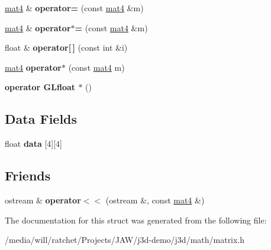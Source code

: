 \begin{DoxyCompactItemize}
\item 
\hypertarget{structj3d_1_1mat4_a9a71377f2c96a29f471befda124d60d7}{}\hyperlink{structj3d_1_1mat4}{mat4} \& {\bfseries operator=} (const \hyperlink{structj3d_1_1mat4}{mat4} \&m)\label{structj3d_1_1mat4_a9a71377f2c96a29f471befda124d60d7}

\item 
\hypertarget{structj3d_1_1mat4_ab14982474a28b0ebf2601388e0155c6a}{}\hyperlink{structj3d_1_1mat4}{mat4} \& {\bfseries operator$\ast$=} (const \hyperlink{structj3d_1_1mat4}{mat4} \&m)\label{structj3d_1_1mat4_ab14982474a28b0ebf2601388e0155c6a}

\item 
\hypertarget{structj3d_1_1mat4_a25bc83b10d8f478916cca0bb9c61bd60}{}float \& {\bfseries operator\mbox{[}$\,$\mbox{]}} (const int \&i)\label{structj3d_1_1mat4_a25bc83b10d8f478916cca0bb9c61bd60}

\item 
\hypertarget{structj3d_1_1mat4_a151d90e204efdcffa8940b8b0d541233}{}\hyperlink{structj3d_1_1mat4}{mat4} {\bfseries operator$\ast$} (const \hyperlink{structj3d_1_1mat4}{mat4} m)\label{structj3d_1_1mat4_a151d90e204efdcffa8940b8b0d541233}

\item 
\hypertarget{structj3d_1_1mat4_a60fd63eefecd4d85278cb744481fe27c}{}{\bfseries operator G\+Lfloat $\ast$} ()\label{structj3d_1_1mat4_a60fd63eefecd4d85278cb744481fe27c}

\end{DoxyCompactItemize}
\subsection*{Data Fields}
\begin{DoxyCompactItemize}
\item 
\hypertarget{structj3d_1_1mat4_a13193f5aeaa5a2daaf50563b3c62439d}{}float {\bfseries data} \mbox{[}4\mbox{]}\mbox{[}4\mbox{]}\label{structj3d_1_1mat4_a13193f5aeaa5a2daaf50563b3c62439d}

\end{DoxyCompactItemize}
\subsection*{Friends}
\begin{DoxyCompactItemize}
\item 
\hypertarget{structj3d_1_1mat4_aa8eb074e83309a02a5ef896ca5eb65c6}{}ostream \& {\bfseries operator$<$$<$} (ostream \&, const \hyperlink{structj3d_1_1mat4}{mat4} \&)\label{structj3d_1_1mat4_aa8eb074e83309a02a5ef896ca5eb65c6}

\end{DoxyCompactItemize}


The documentation for this struct was generated from the following file\+:\begin{DoxyCompactItemize}
\item 
/media/will/ratchet/\+Projects/\+J\+A\+W/j3d-\/demo/j3d/math/matrix.\+h\end{DoxyCompactItemize}
